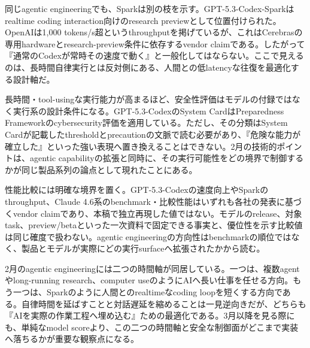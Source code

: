 同じagentic engineeringでも、Sparkは別の枝を示す。GPT-5.3-Codex-Sparkはrealtime coding interaction向けのresearch previewとして位置付けられた。OpenAIは1,000 tokens/s超というthroughputを掲げているが、これはCerebrasの専用hardwareとresearch-preview条件に依存するvendor claimである。したがって『通常のCodexが常時その速度で動く』と一般化してはならない。ここで見えるのは、長時間自律実行とは反対側にある、人間との低latencyな往復を最適化する設計軸だ。\autocite{src-15823ae5556e,src-4a841ea7ec7c,src-9aba7995b6a5,src-dd64fe3084a4}


\begin{claimboundary}
長時間・tool-usingな実行能力が高まるほど、安全性評価はモデルの付録ではなく実行系の設計条件になる。GPT-5.3-CodexのSystem CardはPreparedness Frameworkのcybersecurity評価を適用している。ただし、その分類はSystem Cardが記載したthresholdとprecautionの文脈で読む必要があり、『危険な能力が確立した』といった強い表現へ置き換えることはできない。2月の技術的ポイントは、agentic capabilityの拡張と同時に、その実行可能性をどの境界で制御するかが同じ製品系列の論点として現れたことにある。\autocite{src-15823ae5556e,src-4a841ea7ec7c,src-9aba7995b6a5,src-dd64fe3084a4}
\end{claimboundary}

\begin{claimboundary}
性能比較には明確な境界を置く。GPT-5.3-Codexの速度向上やSparkのthroughput、Claude 4.6系のbenchmark・比較性能はいずれも各社の発表に基づくvendor claimであり、本稿で独立再現した値ではない。モデルのrelease、対象task、preview/betaといった一次資料で固定できる事実と、優位性を示す比較値は同じ確度で扱わない。agentic engineeringの方向性はbenchmarkの順位ではなく、製品とモデルが実際にどの実行surfaceへ拡張されたかから読む。\autocite{src-15823ae5556e,src-4a841ea7ec7c,src-9aba7995b6a5,src-dd64fe3084a4,src-f6aa679babd7}
\end{claimboundary}

2月のagentic engineeringには二つの時間軸が同居している。一つは、複数agentやlong-running research、computer useのようにAIへ長い仕事を任せる方向。もう一つは、Sparkのように人間とのrealtimeなcoding loopを短くする方向である。自律時間を延ばすことと対話遅延を縮めることは一見逆向きだが、どちらも『AIを実際の作業工程へ埋め込む』ための最適化である。3月以降を見る際にも、単純なmodel scoreより、この二つの時間軸と安全な制御面がどこまで実装へ落ちるかが重要な観察点になる。\autocite{src-15823ae5556e,src-4a841ea7ec7c,src-9aba7995b6a5,src-dd64fe3084a4,src-f6aa679babd7}

